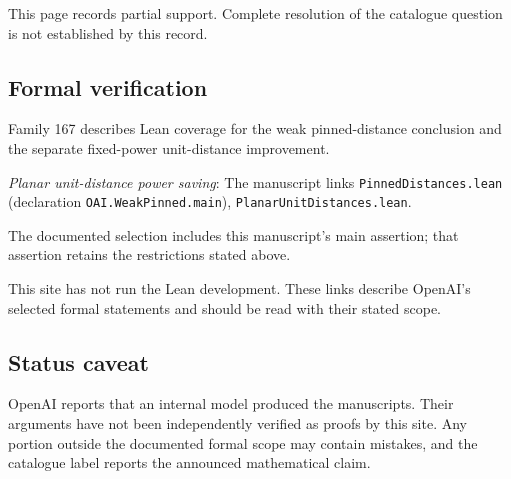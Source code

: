 \documentclass[11pt]{article}
\begin{document}
This page records partial support. Complete resolution of the catalogue question is not established by this record.

\subsection{Formal verification}
Family 167 describes Lean coverage for the weak pinned-distance conclusion and the separate fixed-power unit-distance improvement.

\textit{Planar unit-distance power saving}: The manuscript links \texttt{PinnedDistances.lean} (declaration \texttt{OAI.WeakPinned.main}), \texttt{PlanarUnitDistances.lean}.

The documented selection includes this manuscript’s main assertion; that assertion retains the restrictions stated above.

This site has not run the Lean development. These links describe OpenAI’s selected formal statements and should be read with their stated scope.

\subsection{Status caveat}
OpenAI reports that an internal model produced the manuscripts. Their arguments have not been independently verified as proofs by this site. Any portion outside the documented formal scope may contain mistakes, and the catalogue label reports the announced mathematical claim.
\end{document}
